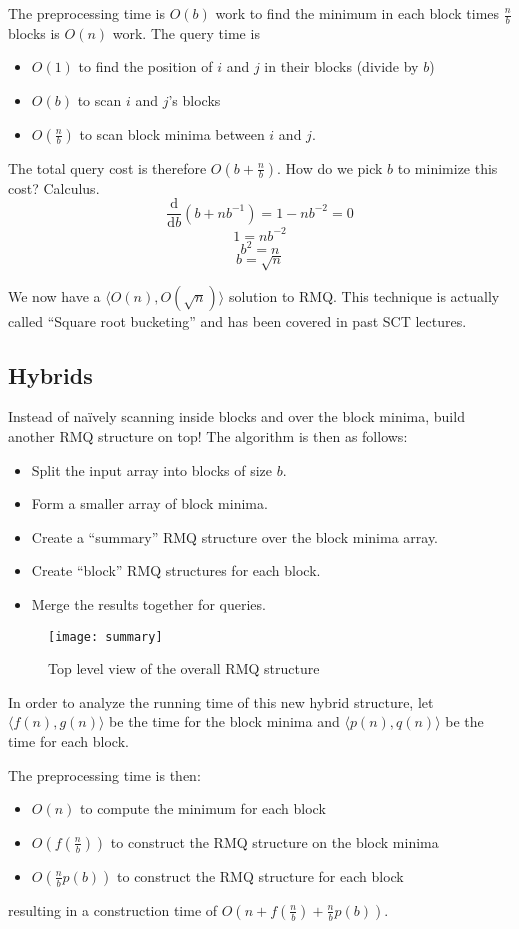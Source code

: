 \documentclass[11pt, oneside]{article}
\begin{document}
The preprocessing time is \( O(b) \) work to find the minimum in each block times
\( \frac{n}{b} \) blocks is \( O(n) \) work. The query time is
\begin{itemize}
  \item \( O(1) \) to find the position of \( i \) and \( j \) in their blocks (divide by \( b \))
  \item \( O(b) \) to scan \( i \) and \( j \)'s blocks
  \item \( O(\frac{n}{b}) \) to scan block minima between \( i \) and \( j \).
\end{itemize}
The total query cost is therefore \( O(b + \frac{n}{b}) \).
How do we pick \( b \) to minimize this cost? Calculus.
\[ \frac{\mathrm{ d}}{\mathrm{ d}b} (b + n b^{-1}) = 1 - n b^{-2} = 0 \]
\[ 1 = n b^{-2} \]
\[ b^2 = n \]
\[ b = \sqrt{n} \]

We now have a \( \langle O(n), O(\sqrt{n}) \rangle \) solution to RMQ. This technique is
actually called ``Square root bucketing'' and has been covered in past SCT lectures.

\subsection{Hybrids}

Instead of naïvely scanning inside blocks and over the block minima, build another RMQ
structure on top! The algorithm is then as follows:
\begin{itemize}
  \item Split the input array into blocks of size \( b \).
  \item Form a smaller array of block minima.
  \item Create a ``summary'' RMQ structure over the block minima array.
  \item Create ``block'' RMQ structures for each block.
  \item Merge the results together for queries.
\end{itemize}

\begin{figure}[h!]
\centering
\texttt{[image: summary]}
\caption{Top level view of the overall RMQ structure}
\end{figure}

In order to analyze the running time of this new hybrid structure, let
\( \langle f(n), g(n) \rangle \) be the time for the block minima and
\( \langle p(n), q(n) \rangle \) be the time for each block.

The preprocessing time is then:
\begin{itemize}
  \item \( O(n) \) to compute the minimum for each block
  \item \( O(f(\frac{n}{b})) \) to construct the RMQ structure on the block minima
  \item \( O(\frac{n}{b} p(b)) \) to construct the RMQ structure for each block
\end{itemize}
resulting in a construction time of \( O(n + f(\frac{n}{b}) + \frac{n}{b} p(b)) \).
\end{document}
